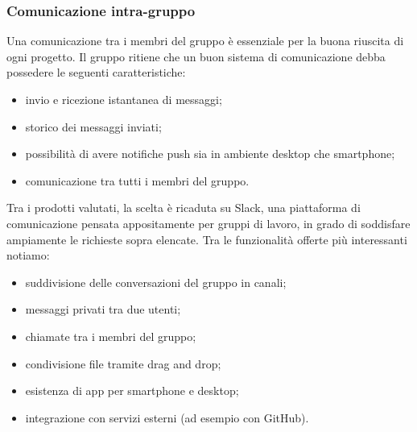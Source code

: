 \subsubsection{Comunicazione intra-gruppo} 
Una comunicazione tra i membri del gruppo è essenziale per la buona riuscita di ogni progetto. Il gruppo ritiene che un buon sistema di comunicazione debba possedere le seguenti caratteristiche:
\begin{itemize}
	\item invio e ricezione istantanea di messaggi;
	\item storico dei messaggi inviati;
	\item possibilità di avere notifiche push sia in ambiente desktop che smartphone;
	\item comunicazione tra tutti i membri del gruppo.
\end{itemize}
Tra i prodotti valutati, la scelta è ricaduta su Slack, una piattaforma di comunicazione pensata appositamente per gruppi di lavoro, in grado di soddisfare ampiamente le richieste sopra elencate. Tra le funzionalità offerte più interessanti notiamo:
\begin{itemize}
	\item suddivisione delle conversazioni del gruppo in canali;
	\item messaggi privati tra due utenti;
	\item chiamate tra i membri del gruppo; 
	\item condivisione file tramite drag and drop;
	\item esistenza di app per smartphone e desktop;
	\item integrazione con servizi esterni (ad esempio con GitHub).
\end{itemize}
